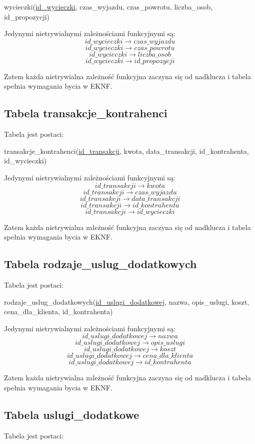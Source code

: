 \documentclass[a4paper,12pt]{mwart}
\begin{document}
wycieczki(\underline{id\_wycieczki}, czas\_wyjazdu, czas\_powrotu, liczba\_osob, id\_propozycji)

\noindent Jedynymi nietrywialnymi zależnościami funkcyjnymi są:
$$   id\_wycieczki\rightarrow czas\_wyjazdu$$
$$   id\_wycieczki\rightarrow czas\_powrotu $$
$$   id\_wycieczki\rightarrow liczba\_osob $$
$$   id\_wycieczki\rightarrow id\_propozycji $$


Zatem każda nietrywialna zależność funkcyjna zaczyna się od nadklucza i tabela  spełnia wymagania bycia w EKNF.

\subsection{Tabela transakcje\_kontrahenci}
Tabela jest postaci:

transakcje\_kontrahenci(\underline{id\_transakcji}, kwota, data\_transakcji, id\_kontrahenta, id\_wycieczki)

\noindent Jedynymi nietrywialnymi zależnościami funkcyjnymi są:
$$   id\_transakcji\rightarrow kwota $$
$$   id\_transakcji\rightarrow czas\_wyjazdu$$
$$   id\_transakcji\rightarrow data\_transakcji $$
$$   id\_transakcji\rightarrow id\_kontrahenta $$
$$   id\_transakcji\rightarrow id\_wycieczki$$

Zatem każda nietrywialna zależność funkcyjna zaczyna się od nadklucza i tabela  spełnia wymagania bycia w EKNF.

\subsection{Tabela rodzaje\_uslug\_dodatkowych}
Tabela jest postaci:

 rodzaje\_uslug\_dodatkowych(\underline{id\_uslugi\_dodatkowej}, nazwa, opis\_uslugi, koszt, cena\_dla\_klienta, id\_kontrahenta)

\noindent Jedynymi nietrywialnymi zależnościami funkcyjnymi są:
$$   id\_uslugi\_dodatkowej\rightarrow nazwa $$
$$   id\_uslugi\_dodatkowej\rightarrow opis\_uslugi$$
$$   id\_uslugi\_dodatkowej\rightarrow koszt$$
$$   id\_uslugi\_dodatkowej\rightarrow cena\_dla\_klienta $$
$$   id\_uslugi\_dodatkowej\rightarrow id\_kontrahenta$$

Zatem każda nietrywialna zależność funkcyjna zaczyna się od nadklucza i tabela  spełnia wymagania bycia w EKNF.


\subsection{Tabela uslugi\_dodatkowe}
Tabela jest postaci:
\end{document}
